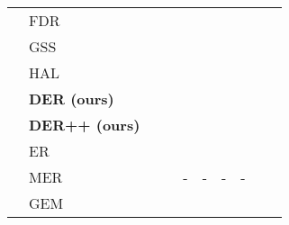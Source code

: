 \documentclass{article}
\begin{document}
\begin{table}[H]
{{\begin{tabular}{clcccccccc}
                        & FDR                   &  \tiny{}                                  &   \tiny{}                                  & \tiny{}                                           &   \tiny{}                                          & \tiny{}                                               & \tiny{} \\
                        & GSS                   &  \tiny{}                                  &   \tiny{}                                  & \tiny{}                                           &   \tiny{}                                          & \tiny{}                                               & \tiny{} \\
                        & HAL                   &  \tiny{}                                  &   \tiny{}                                  & \tiny{}                                           &  \tiny{}                                          & \tiny{}                                               & \tiny{} \\
                        & \textbf{DER (ours)}   &  \tiny{}                                  &   \tiny{}                                  & \tiny{}                                           &   \tiny{}                                          & \tiny{}                                               &  \tiny{} \\
                        & \textbf{DER++ (ours)} &  \tiny{}                                  &   \tiny{}                                  & \tiny{}                                           &   \tiny{}                                          & \tiny{}                     &  \tiny{} \\
\midrule                                                                                            
                        & ER                    &  \tiny{}                                  &   \tiny{}                                  & \tiny{}                                           &   \tiny{}                                          & \tiny{}                                               &  \tiny{} \\
                        & MER                   &  \tiny{}                                  &   \tiny{}                                  & -                                                                  & -                                                                & -                                                                     & -                       \\
                        & GEM                   &  \tiny{}                                  &   \tiny{}                                  & \tiny{}                                           &   \tiny{}                                          & \tiny{}                                               &  \tiny{} \\

\end{tabular}}}
\end{table}
\end{document}
